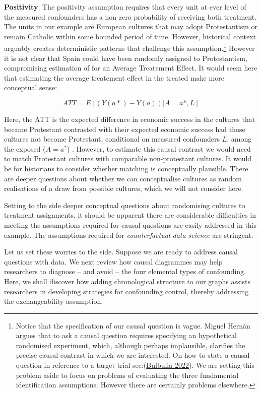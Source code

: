 \documentclass[
  singlecolumn]{report}
\begin{document}
\textbf{Positivity}: The positivity assumption requires that every unit
at ever level of the measured confounders has a non-zero probability of
receiving both treatment. The units in our example are European cultures
that may adopt Protestantism or remain Catholic within some bounded
period of time. However, historical context arguably creates
deterministic patterns that challenge this assumption.\footnote{Notice
  that the specification of our causal question is vague. Miguel Hernán
  argues that to ask a causal question requires specifying an
  hypothetical randomised experiment, which, although perhaps
  implausible, clarifies the precise causal contrast in which we are
  interested. On how to state a causal question in reference to a target
  trial see:(\protect\hyperlink{ref-bulbulia2022}{Bulbulia 2022}). We
  are setting this problem aside to focus on problems of evaluating the
  three fundamental identification assumptions. However there are
  certainly problems elsewhere.} However it is not clear that Spain
could have been randomly assigned to Protestantism, compromising
estimation of for an Average Treatement Effect. It would seem here that
estimating the average treatement effect in the treated make more
conceptual sense:

\[ATT = E[(Y(a*)- Y(a))|A = a*,L]\]

Here, the ATT is the expected difference in economic success in the
cultures that became Protestant contrasted with their expected economic
success had those cultures not become Protestant, conditional on
measured confounders \(L\), among the exposed (\(A = a^*\)) . However,
to estimate this causal contrast we would need to match Protestant
cultures with comparable non-protestant cultures. It would be for
historians to consider whether matching is conceptually plausible. There
are deeper questions about whether we can conceptualise cultures as
random realisations of a draw from possible cultures, which we will not
consider here.

Setting to the side deeper conceptual questions about randomising
cultures to treatment assignments, it should be apparent there are
considerable difficulties in meeting the assumptions required for causal
questions are easily addressed in this example. The assumptions required
for \emph{counterfactual data science} are stringent.

Let us set these worries to the side. Suppose we are ready to address
causal questions with data. We next review how causal diagrammes may
help researchers to diagnose -- and avoid -- the four elemental types of
confounding. Here, we shall discover how adding chronological structure
to our graphs assists researchers in developing strategies for
confounding control, thereby addressing the exchangeability assumption.
\end{document}
